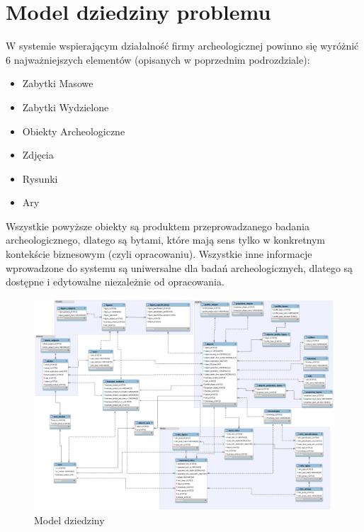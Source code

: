\section{Model dziedziny problemu}
W systemie wspierającym działalność firmy archeologicznej powinno się wyróżnić 6 najważniejszych elementów (opisanych w poprzednim podrozdziale):
\begin{itemize}
\item Zabytki Masowe\\
\item Zabytki Wydzielone\\
\item Obiekty Archeologiczne\\
\item Zdjęcia\\
\item Rysunki\\
\item Ary
\end{itemize}

Wszystkie powyższe obiekty są produktem przeprowadzanego badania archeologicznego, dlatego są bytami, które mają sens tylko w konkretnym kontekście biznesowym (czyli opracowaniu). Wszystkie inne informacje wprowadzone do systemu są uniwersalne dla badań archeologicznych, dlatego są dostępne i edytowalne niezależnie od opracowania.

\begin{figure} [H]
    \begin{center}
	\includegraphics[angle=90, scale=.26]{img/db.png}
	\caption{Model dziedziny}
	\label{modelDziedziny}
    \end{center}
\end{figure}

